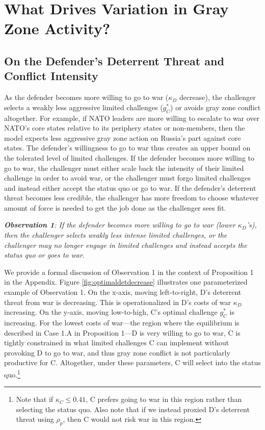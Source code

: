 \documentclass[11pt,letterpaper,pdftex,dvipsnames,table]{article}
\begin{document}
\section{What Drives Variation in Gray Zone Activity?}\label{grayzonevar}
\subsection{On the Defender's Deterrent Threat and Conflict Intensity}
As the defender becomes more willing to go to war ($\kappa_{D}$ decrease), the challenger selects a weakly less aggressive limited challenges ($g_{C}^{*}$) or avoids gray zone conflict altogether. For example, if NATO leaders are more willing to escalate to war over NATO's core states relative to its periphery states or non-members, then the model expects less aggressive gray zone action on Russia's part against core states. The defender's willingness to go to war thus creates an upper bound on the tolerated level of limited challenges. If the defender becomes more willing to go to war, the challenger must either scale back the intensity of their limited challenge in order to avoid war, or the challenger must forgo limited challenges and instead either accept the status quo or go to war. If the defender's deterrent threat becomes less credible, the challenger has more freedom to choose whatever amount of force is needed to get the job done as the challenger sees fit.

\textbf{\textit{Observation 1}}\textit{: If the defender becomes more willing to go to war (lower $\kappa_{D}$'s), then the challenger selects weakly less intense limited challenges, or the challenger may no longer engage in limited challenges and instead accepts the status quo or goes to war.}

We provide a formal discussion of Observation 1 in the context of Proposition 1 in the Appendix. Figure \ref{fig:optimaldetdecrease} illustrates one parameterized example of Observation 1. On the x-axis, moving left-to-right, D's deterrent threat from war is decreasing. This is operationalized in D's costs of war $\kappa_{D}$ increasing. On the y-axis, moving low-to-high, C's optimal challenge $g_{C}^{*}$ is increasing. For the lowest costs of war---the region where the equilibrium is described in Case 1.A in Proposition 1---D is very willing to go to war, C is tightly constrained in what limited challenges C can implement without provoking D to go to war, and thus gray zone conflict is not particularly productive for C. Altogether, under these parameters, C will select into the status quo.\footnote{Note that if $\kappa_{C} \leq 0.41$, C prefers going to war in this region rather than selecting the status quo. Also note that if we instead proxied D's deterrent threat using $\rho_p$, then C would not risk war in this region.}
\end{document}
